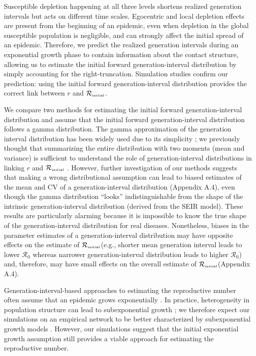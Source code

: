 \documentclass[12pt]{article}
\newcommand{\Rx}[1]{\ensuremath{{\mathcal R}_{#1}}\xspace}
\newcommand{\Ro}{\Rx{0}}
\newcommand{\Rini}{\Rx{\textrm{\tiny initial}}}
\begin{document}
Susceptible depletion happening at all three levels shortens realized generation intervals but acts on different time scales.
Egocentric and local depletion effects are present from the beginning of an epidemic, even when depletion in the global susceptible population is negligible, and can strongly affect the initial spread of an epidemic.
Therefore, we predict the realized generation intervals during an exponential growth phase to contain information about the contact structure, allowing us to estimate the initial forward generation-interval distribution by simply accounting for the right-truncation.
Simulation studies confirm our prediction: using the initial forward generation-interval distribution provides the correct link between $r$ and $\Rini$.

We compare two methods for estimating the initial forward generation-interval distribution and assume that the initial forward generation-interval distribution follows a gamma distribution.
The gamma approximation of the generation interval distribution has been widely used due to its simplicity \citep{mcbryde2009early, nishiura2009transmission, roberts2011early, trichereau2012estimation, nishiura2015theoretical};
we previously thought that summarizing the entire distribution with two moments (mean and variance) is sufficient to understand the role of generation-interval distributions in linking $r$ and $\Rini$ \citep{park2019practical}.
However, further investigation of our methods suggests that making a wrong distributional assumption can lead to biased estimates of the mean and CV of a generation-interval distribution (Appendix A.4), even though the gamma distribution ``looks'' indistinguishable from the shape of the intrinsic generation-interval distribution (derived from the SEIR model).
These results are particularly alarming because it is impossible to know the true shape of the generation-interval distribution for real diseases.
Nonetheless, biases in the parameter estimates of a generation-interval distribution may have opposite effects on the estimate of \Rini (e.g., shorter mean generation interval leads to lower \Ro whereas narrower generation-interval distribution leads to higher \Ro) and, therefore, may have small effects on the overall estimate of \Rini (Appendix A.4).

Generation-interval-based approaches to estimating the reproductive number often assume that an epidemic grows exponentially \citep{wearing2005appropriate, wallinga2007generation, roberts2007model, park2019practical}.
In practice, heterogeneity in population structure can lead to subexponential growth \citep{szendroi2004polynomial, chowell2015western, chowell2016growing, chowell2016characterizing, kiskowski2016modeling, viboud2016generalized};
we therefore expect our simulations on an empirical network to be better characterized by subexponential growth models \citep{viboud2016generalized}.
However, our simulations suggest that the initial exponential growth assumption still provides a viable approach for estimating the reproductive number.
\end{document}
